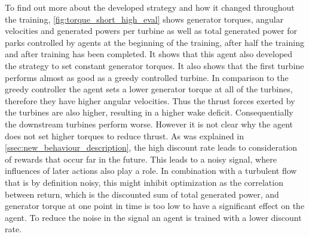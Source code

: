 To find out more about the developed strategy and how it changed throughout the training, \autoref{fig:torque_short_high_eval} shows generator torques, angular velocities and generated powers per turbine as well as total generated power for parks controlled by agents at the beginning of the training, after half the training and after training has been completed. It shows that this agent also developed the strategy to set constant generator torques.  It also  shows that the first turbine performs almost as good as a greedy controlled turbine. In comparison to the greedy controller the agent sets a lower generator torque at all of the turbines, therefore they have higher angular velocities. Thus the thrust forces exerted by the turbines are also higher, resulting in a higher wake deficit. Consequentially the downstream turbines perform worse. However it is not clear why the agent does not set higher torques to reduce thrust. As was explained in \autoref{ssec:new_behaviour_description}, the high discount rate leads to consideration of rewards that occur far in the future. This leads to a noisy signal, where influences of later actions also play a role. In combination with a turbulent flow that is by definition noisy, this might inhibit optimization as the correlation between return, which is the discounted sum of total generated power, and generator torque at one point in time is too low to have a significant effect on the agent. To reduce the noise in the signal an agent is trained with a lower discount rate. \newpage
